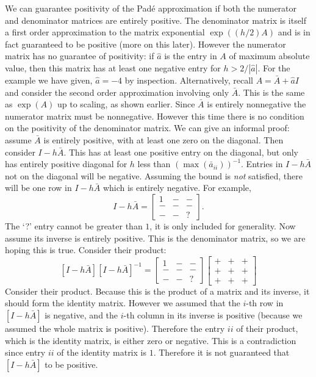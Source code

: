We can guarantee positivity of the Pad\'e approximation if both the numerator and denominator matrices are entirely positive.
The denominator matrix is itself a first order approximation to the matrix exponential $\exp((h/2)A)$ and is in fact guaranteed to be positive (more on this later).
However the numerator matrix has no guarantee of positivity: if $\hat{a}$ is the entry in $A$ of maximum absolute value,
then this matrix has at least one negative entry for $h > 2/|\hat{a}|$.
For the example we have given, $\hat{a} = -4$ by inspection.
Alternatively, recall $A = \bar{A} + \hat{a}I$ and consider the second order approximation involving only $\bar{A}$.
This is the same as $\exp(A)$ up to scaling, as shown earlier.
Since $\bar{A}$ is entirely nonnegative the numerator matrix must be nonnegative.
However this time there is no condition on the positivity of the denominator matrix.
We can give an informal proof:
assume $\bar{A}$ is entirely positive, with at least one zero on the diagonal.
Then consider $I - h\bar{A}$. This has at least one positive entry on the diagonal, but only has entirely positive diagonal for $h$ less than $(\max(\bar{a}_{ii}))^{-1}$.
Entries in $I - h\bar{A}$ not on the diagonal will be negative. Assuming the bound is \textit{not} satisfied, there will be one row in $I - h\bar{A}$ which is entirely negative.
For example,
\begin{equation*}
    I - h\bar{A} = \begin{bmatrix}
        1 & - & - \\
        - & - & - \\
        - & - & ?
    \end{bmatrix}.
\end{equation*}
The `?' entry cannot be greater than $1$, it is only included for generality.
Now assume its inverse is entirely positive. This is the denominator matrix, so we are hoping this is true.
Consider their product:
\begin{equation*}
    \left[I - h\bar{A}\right] \left[I - h\bar{A}\right]^{-1} = \begin{bmatrix}
        1 & - & - \\
        - & - & - \\
        - & - & ?
    \end{bmatrix} \begin{bmatrix}
        + & + & + \\
        + & + & + \\
        + & + & +
    \end{bmatrix}
\end{equation*}
Consider their product. Because this is the product of a matrix and its inverse, it should form the identity matrix.
However we assumed that the $i$-th row in $[I - h\bar{A}]$ is negative, and the $i$-th column in its inverse is positive (because we assumed the whole matrix is positive).
Therefore the entry $ii$ of their product, which is the identity matrix, is either zero or negative. This is a contradiction since entry $ii$ of the identity matrix is $1$.
Therefore it is not guaranteed that $[I - h\bar{A}]$ to be positive.

